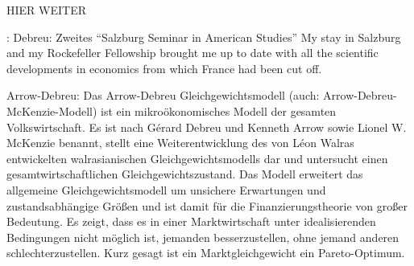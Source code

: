 HIER WEITER \textcite{Kurz1993}




\parencite{Debreu1983}:
Debreu: Zweites "`Salzburg Seminar in American Studies"' My stay in Salzburg and my Rockefeller Fellowship brought me up to date with all the scientific developments in economics from which France had been cut off.


Arrow-Debreu: \parencite[S. 28]{Weintraub1983}
Das Arrow-Debreu Gleichgewichtsmodell (auch: Arrow-Debreu-McKenzie-Modell) ist ein mikroökonomisches Modell der gesamten Volkswirtschaft. Es ist nach Gérard Debreu und Kenneth Arrow sowie Lionel W. McKenzie benannt, stellt eine Weiterentwicklung des von Léon Walras entwickelten walrasianischen Gleichgewichtsmodells dar und untersucht einen gesamtwirtschaftlichen Gleichgewichtszustand. 
Das Modell erweitert das allgemeine Gleichgewichtsmodell um unsichere Erwartungen und zustandsabhängige Größen und ist damit für die Finanzierungstheorie von großer Bedeutung. Es zeigt, dass es in einer Marktwirtschaft unter idealisierenden Bedingungen nicht möglich ist, jemanden besserzustellen, ohne jemand anderen schlechterzustellen. Kurz gesagt ist ein Marktgleichgewicht ein Pareto-Optimum. 















